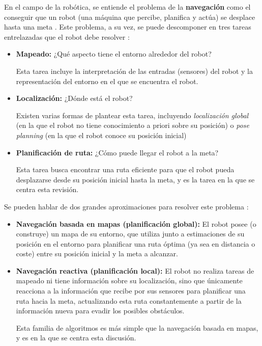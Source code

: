 En el campo de la robótica, se entiende el problema de la \textbf{navegación} como el conseguir que un robot (una máquina que percibe, planifica y actúa) se desplace hasta una meta \cite{10.5555/3152585}. Este problema, a su vez, se puede descomponer en tres tareas entrelazadas que el robot debe resolver \cite{mappingexploration}:
\begin{itemize}
	\item \textbf{Mapeado:} ¿Qué aspecto tiene el entorno alrededor del robot?
	
	Esta tarea incluye la interpretación de las entradas (sensores) del robot y la representación del entorno en el que se encuentra el robot.
	\item \textbf{Localización:} ¿Dónde está el robot?
	
	Existen varias formas de plantear esta tarea, incluyendo \textit{localización global} (en la que el robot no tiene conocimiento a priori sobre su posición) o \textit{pose planning} (en la que el robot conoce su posición inicial)
	
	\item \textbf{Planificación de ruta:} ¿Cómo puede llegar el robot a la meta?
	
	Esta tarea busca encontrar una ruta eficiente para que el robot pueda desplazarse desde su posición inicial hasta la meta, y es la tarea en la que se centra esta revisión.
\end{itemize}

Se pueden hablar de dos grandes aproximaciones para resolver este problema \cite{10.5555/3152585}:

\begin{itemize}
	\item \textbf{Navegación basada en mapas (planificación global):} El robot posee (o construye) un mapa de su entorno, que utiliza junto a estimaciones de su posición en el entorno para planificar una ruta óptima (ya sea en distancia o coste) entre su posición inicial y la meta a alcanzar.
	
	\item \textbf{Navegación reactiva (planificación local):} El robot no realiza tareas de mapeado ni tiene información sobre su localización, sino que únicamente reacciona a la información que recibe por sus sensores para planificar una ruta hacia la meta, actualizando esta ruta constantemente a partir de la información nueva para evadir los posibles obstáculos.
	
	Esta familia de algoritmos es más simple que la navegación basada en mapas, y es en la que se centra esta discusión.
\end{itemize}

